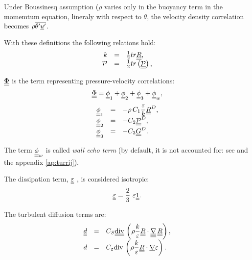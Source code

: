 \begin{remark}
Under Boussinesq assumption ($\rho$ varies only in the buoyancy term in the momemtum equation, lineraly with respect to $\theta$, the velocity density correlation becomes $\rho \overline{\theta^\prime \underline{u}^\prime}$.
\end{remark}

With these definitions the following relations hold:
\begin{equation}
\begin{array}{r c l}
\displaystyle k &=&\frac{1}{2} tr{\underline{\underline{R}}}, \\
\mathcal{P} &=&\frac{1}{2} tr \left( \underline{\underline{\mathcal{P}}} \right) ,
\end{array}
\end{equation}

$\underline{\underline{\Phi}}$ is the term representing pressure-velocity correlations:
\begin{equation}
\displaystyle \underline{\underline{\Phi}} = \underline{\underline{\phi}}_{1}+ \underline{\underline{\phi}}_{2}+ \underline{\underline{\phi}}_{3}+ \underline{\underline{\phi}}_{w},
\end{equation}%
%
\begin{equation}
\begin{array}{r c l}
\tens{\phi}_{1} &=& \displaystyle -\rho \,C_{1}\frac{\varepsilon }{k}%
\deviator{\tens{R}}, \\
\tens{\phi}_{2} &=& -C_{2} \deviator{\tens{\mathcal{P}}}, \\
\tens{\phi}_{3} &=& -C_{3} \deviator{ \tens{G} }.
\end{array}
\end{equation}

The term $\underline{\underline{\phi}}_{w}$ is called \emph{wall echo term} (by default, it is not
accounted for: see  and the appendix \ref{ap:turrij}).

The dissipation term, $\underline{\underline{\varepsilon}}$ , is considered isotropic:
\begin{equation}
\displaystyle \underline{\underline{\varepsilon}}=\frac{2}{3}\ \varepsilon \underline{\underline{1}}.
\end{equation}

The turbulent diffusion terms are:
\begin{equation}
\begin{array}{r c l}
\tens{d} & = & C_{S} \displaystyle \divt \left( \rho \frac{k}{\varepsilon }%
\tens{R} \cdot \gradtt \, \tens{R} \right), \\
d & = & C_{\varepsilon }\displaystyle \dive \left( \rho \frac{k}{\varepsilon}
\tens{R} \cdot \grad \varepsilon \right).
\end{array}
\end{equation}

